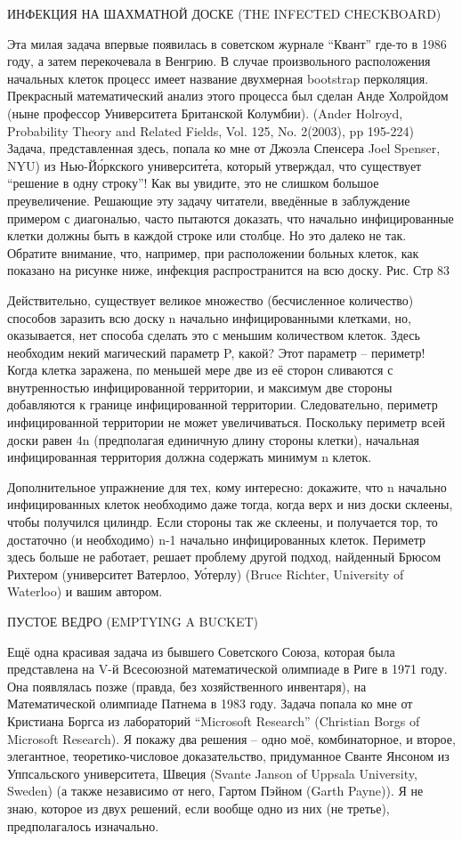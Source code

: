 ﻿ИНФЕКЦИЯ НА ШАХМАТНОЙ ДОСКЕ (THE INFECTED CHECKBOARD)


   Эта милая задача впервые появилась в советском журнале “Квант” где-то в 1986 году, а затем перекочевала в Венгрию. В случае произвольного расположения начальных клеток процесс имеет название двухмерная bootstrap перколяция. Прекрасный математический анализ этого процесса был сделан Анде Холройдом (ныне профессор Университета Британской Колумбии). (Ander Holroyd, Probability Theory and Related Fields, Vol. 125, No. 2(2003), pp 195-224) Задача, представленная здесь, попала ко мне от Джоэла Спенсера Joel Spenser, NYU) из Нью-Йо́ркского университе́та, который утверждал, что существует “решение в одну строку”! Как вы увидите, это не слишком большое преувеличение.
   Решающие эту задачу читатели, введённые в заблуждение примером с диагональю, часто пытаются доказать, что начально инфицированные клетки должны быть в каждой строке или столбце. Но это далеко не так.  Обратите внимание, что, например, при расположении больных клеток, как показано на рисунке ниже, инфекция распространится на всю доску.
                                      Рис. Стр 83


   Действительно, существует великое множество (бесчисленное количество) способов заразить всю доску n начально инфицированными клетками, но, оказывается, нет способа сделать это с меньшим количеством клеток. Здесь необходим некий магический параметр P, какой?
   Этот параметр -- периметр! Когда клетка заражена, по меньшей мере две из её сторон сливаются с внутренностью инфицированной территории, и максимум две стороны добавляются к границе инфицированной территории. Следовательно, периметр инфицированной территории не может увеличиваться. Поскольку периметр всей доски равен 4n (предполагая единичную длину стороны клетки), начальная инфицированная территория должна содержать минимум n клеток.


   Дополнительное упражнение для тех, кому интересно: докажите, что n начально инфицированных клеток необходимо даже тогда, когда верх и низ доски склеены, чтобы получился цилиндр. Если стороны так же склеены, и получается тор, то достаточно (и необходимо) n-1 начально инфицированных клеток. Периметр здесь больше не работает,
решает проблему другой подход, найденный Брюсом Рихтером (университет Ватерлоо, Уо́терлу) (Bruce Richter, University of Waterloo) и вашим автором.




ПУСТОЕ ВЕДРО (EMPTYING A BUCKET)


   Ещё одна красивая задача из бывшего Советского Союза, которая была представлена на V-й Всесоюзной математической олимпиаде в Риге в 1971 году. Она появлялась позже  (правда, без хозяйственного инвентаря), на Математической олимпиаде Патнема в 1983 году. Задача попала ко мне от Кристиана Боргса из лабораторий “Microsoft Research” (Christian Borgs of Microsoft Research). Я покажу два решения -- одно моё, комбинаторное, и второе, элегантное, теоретико-числовое доказательство, придуманное Сванте Янсоном из Уппсальского университета, Швеция (Svante Janson of Uppsala University, Sweden)
(а также независимо от него, Гартом Пэйном (Garth Payne)). Я не знаю, которое из двух решений, если вообще одно из них (не третье), предполагалось изначально.


